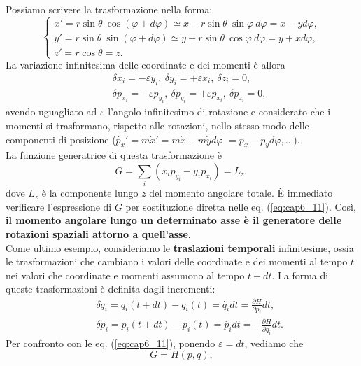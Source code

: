 \documentclass[a4paper,12pt,oneside]{book}
\begin{document}
Possiamo scrivere la trasformazione nella forma:
\begin{equation}
\begin{cases}
x'= r \sin \theta \ \cos (\varphi + d \varphi ) \simeq x- r \sin \theta \ \sin \varphi \ d \varphi = x-yd\varphi ,\\
y'= r \sin \theta \ \sin (\varphi + d \varphi ) \simeq y+ r \sin \theta \ \cos \varphi \ d \varphi = y+xd\varphi ,\\
z' = r\cos \theta = z .
\end{cases}
\end{equation}
La variazione infinitesima delle coordinate e dei momenti è allora
\begin{eqnarray}
& & \delta x_i = -\varepsilon y_i, \ \delta y_i = +\varepsilon x_i, \ \delta z_i =0,\\
& & \delta p_{x_i} = -\varepsilon p_{y_i}, \ \delta p_{y_i} = +\varepsilon p_{x_i}, \ \delta p_{z_i} =0,
\end{eqnarray}
avendo uguagliato ad $\varepsilon$ l'angolo infinitesimo di rotazione e considerato che i momenti si trasformano, rispetto alle rotazioni, nello stesso modo delle componenti di posizione ($\dot{p_x}'= m \dot{x}'=  m\dot{x}-m\dot{y}d\varphi$ $=p_x-p_yd\varphi , \dots$).\\
La funzione generatrice di questa trasformazione è
\begin{equation}
G= \sum _i (x_ip_{y_i} - y_i p_{x_i}) = L_z ,
\end{equation}
dove $L_z$ è la componente lungo $z$ del momento angolare totale. È immediato verificare l'espressione di $G$ per sostituzione diretta nelle eq. (\ref{eq:cap6_11}). Così, \textbf{il momento angolare lungo un determinato asse è il generatore delle rotazioni spaziali attorno a quell'asse}.\\
Come ultimo esempio, consideriamo le \textbf{traslazioni temporali} infinitesime, ossia le trasformazioni che cambiano i valori delle coordinate e dei momenti al tempo $t$ nei valori che coordinate e momenti assumono al tempo $t+dt$. La forma di queste trasformazioni è definita dagli incrementi:
\begin{eqnarray}
& &\delta q_i = q_i(t+dt)-q_i(t) = \dot{q_i} dt = \frac{\partial H}{\partial p_i}dt, \\
& &\delta p_i = p_i(t+dt)-p_i(t) = \dot{p_i} dt = -\frac{\partial H}{\partial q_i}dt. 
\end{eqnarray}
Per confronto con le eq. (\ref{eq:cap6_11}), ponendo $\varepsilon = dt$, vediamo che
\begin{equation}
G=H(p,q) ,
\end{equation}
\end{document}
